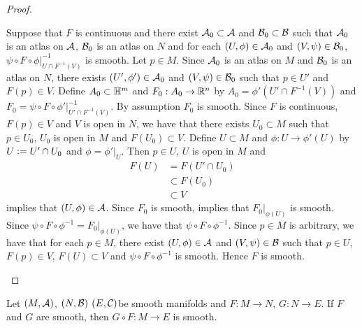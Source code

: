 \documentclass{book}
\begin{document}
\begin{proof}
\begin{enumerate}
		Suppose that $F$ is continuous and there exist $\mathcal{A}_0 \subset \mathcal{A}$ and $\mathcal{B}_0 \subset \mathcal{B}$ such that $\mathcal{A}_0$ is an atlas on $\mathcal{A}$, $\mathcal{B}_0$ is an atlas on $N$ and for each $(U, \phi) \in \mathcal{A}_0$ and $(V, \psi) \in \mathcal{B}_0$, $\psi \circ F \circ \phi|_{U \cap F^{-1}(V)}^{-1}$ is smooth. Let $p \in M$. Since $\mathcal{A}_0$ is an atlas on $M$ and $\mathcal{B}_0$ is an atlas on $N$, there exists $(U',\phi') \in \mathcal{A}_0$ and $(V, \psi) \in \mathcal{B}_0$ such that $p \in U'$ and $F(p) \in V$. Define $A_0 \subset \mathbb{H}^m$ and $F_0:A_0 \rightarrow \mathbb{R}^n$ by $A_0 = \phi'(U' \cap F^{-1}(V))$ and $F_0 = \psi \circ F \circ \phi'|_{U' \cap F^{-1}(V)}^{-1}$. By assumption $F_0$ is smooth. Since $F$ is continuous, $F(p) \in V$ and $V$ is open in $N$, we have that there exists $U_0 \subset M$ such that $p \in U_0$, $U_0$ is open in $M$ and $F(U_0) \subset V$. Define $U \subset M$ and $\phi:U \rightarrow \phi'(U)$ by $U \vcentcolon= U' \cap U_0$ and $\phi = \phi'|_U$. Then $p \in U$, $U$ is open in $M$ and 
		\begin{align*}
			F(U)
			& = F(U' \cap U_0) \\
			& \subset F(U_0) \\
			& \subset V
		\end{align*} 
		 implies that $(U, \phi) \in \mathcal{A}$. Since $F_0$ is smooth,  implies that $F_0|_{\phi(U)}$ is smooth. Since $\psi \circ F \circ \phi^{-1} = F_0|_{\phi(U)}$, we have that $\psi \circ F \circ \phi^{-1}$. Since $p \in M$ is arbitrary, we have that for each $p \in M$, there exist $(U, \phi) \in \mathcal{A}$ and $(V, \psi) \in \mathcal{B}$ such that $p \in U$, $F(p) \in V$, $F(U) \subset V$ and $\psi \circ F \circ \phi^{-1}$ is smooth. Hence $F$ is smooth. 
	\end{enumerate}
\end{proof}

\begin{ex} 
	Let $(M, \mathcal{A})$, $(N, \mathcal{B})$ $(E, \mathcal{C})$be smooth manifolds and $F: M \rightarrow N$, $G: N \rightarrow E$. If $F$ and $G$ are smooth, then $G \circ F: M \rightarrow E$ is smooth.  
\end{ex}
\end{document}

